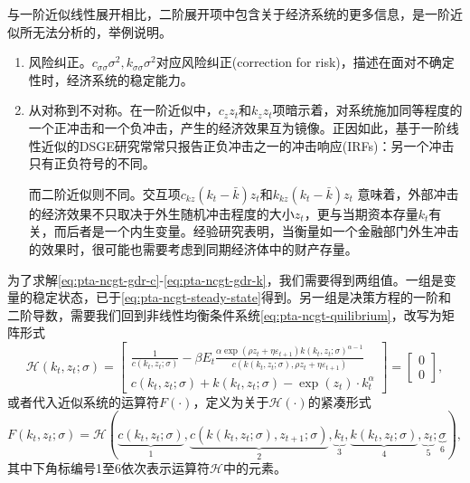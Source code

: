 与一阶近似线性展开相比，二阶展开项中包含关于经济系统的更多信息，是一阶近似所无法分析的，举例说明。
\begin{enumerate}
  \item 风险纠正。$c_{\sigma \sigma}\sigma^2, k_{\sigma \sigma}\sigma^2$对应风险纠正(correction for risk)，描述在面对不确定性时，经济系统的稳定能力。
  \item 从对称到不对称。在一阶近似中，$c_{z}z_t$和$k_{z}z_t$项暗示着，对系统施加同等程度的一个正冲击和一个负冲击，产生的经济效果互为镜像。正因如此，基于一阶线性近似的DSGE研究常常只报告正负冲击之一的冲击响应(IRFs)：另一个冲击只有正负符号的不同。

  而二阶近似则不同。交互项$c_{kz}(k_t - \bar{k})z_t$和$k_{kz}(k_t - \bar{k})z_t$ 意味着，外部冲击的经济效果不只取决于外生随机冲击程度的大小$z_{t}$，更与当期资本存量$k_t$有关，而后者是一个内生变量。经验研究表明，当衡量如一个金融部门外生冲击的效果时，很可能也需要考虑到同期经济体中的财产存量。

\end{enumerate}

为了求解\eqref{eq:pta-ncgt-gdr-c}-\eqref{eq:pta-ncgt-gdr-k}，我们需要得到两组值。一组是变量的稳定状态，已于\eqref{eq:pta-ncgt-steady-state}得到。另一组是决策方程的一阶和二阶导数，需要我们回到非线性均衡条件系统\eqref{eq:pta-ncgt-quilibrium}，改写为矩阵形式
\begin{equation}
  \label{eq:pta-ncgt-equilibrium-matrix}
  \mathcal{H}(k_t,z_t;\sigma) =
  \begin{bmatrix}
    \frac{1}{c(k_t,z_t;\sigma)} - \beta E_t \frac{
    \alpha \exp \left( \rho z_{t} + \eta \varepsilon_{t+1} \right) k(k_t,z_t;\sigma)^{\alpha - 1}
    }{
    c\left(k(k_t,z_t;\sigma),\rho z_{t} + \eta \varepsilon_{t+1}\right)
    }\\
    c(k_t,z_t;\sigma) + k(k_t,z_t;\sigma) - \exp(z_t) \cdot k_t^{\alpha}
  \end{bmatrix}
  =\begin{bmatrix}
  0\\
  0
  \end{bmatrix},
\end{equation}
或者代入近似系统的运算符$F(\cdot)$，定义为关于$\mathcal{H}(\cdot)$的紧凑形式
\begin{equation}
  \label{eq:pta-ncgt-equilibrium-compact}
  F(k_t,z_t;\sigma) = \mathcal{H}\left(
  \underbrace{c(k_t,z_t;\sigma)}_{{1}},
  \underbrace{c(k(k_t,z_t;\sigma),z_{t+1};\sigma)}_{2},
  \underbrace{k_t}_{3},
  \underbrace{k(k_t,z_t;\sigma)}_{4},
  \underbrace{z_t}_{5};
  \underbrace{\sigma}_{6}
  \right),
\end{equation}
其中下角标编号1至6依次表示运算符$\mathcal{H}$中的元素。

